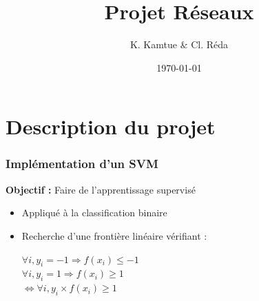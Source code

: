 \documentclass{beamer}
\title{Projet Réseaux}
\author{K. Kamtue \& Cl. Réda}
\institute{ENS Cachan}
\date{\today}
\begin{document}
\maketitle
\tableofcontents
\setlength{\parindent}{1cm}


\section{Description du projet}

\begin{frame}
\frametitle{Implémentation d'un SVM}

\begin{center}
\textbf{Objectif :} Faire de l'apprentissage supervisé
\end{center}

\begin{itemize}
\item Appliqué à la classification binaire

         \begin{center}
         \end{center}

\item Recherche d'une frontière linéaire vérifiant :

         \begin{center}
         $\forall i, y_i = -1 \Rightarrow f(x_i) \leq -1$\\
         $\forall i, y_i = 1 \Rightarrow f(x_i) \geq 1$\\
         $\Leftrightarrow \forall i, y_i \times f(x_i) \geq 1$
         \end{center}
\end{itemize}

\end{frame}
\end{document}
